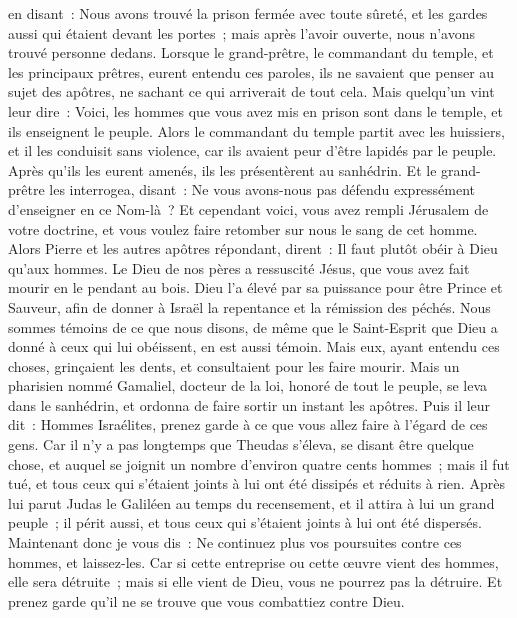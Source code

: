 \begin{multicols}{2}
en disant~: Nous avons trouvé la prison fermée avec toute sûreté, et les gardes aussi qui étaient devant les portes~; mais après l'avoir ouverte, nous n'avons trouvé personne dedans.
Lorsque le grand-prêtre, le commandant du temple, et les principaux prêtres, eurent entendu ces paroles, ils ne savaient que penser au sujet des apôtres, ne sachant ce qui arriverait de tout cela.
Mais quelqu'un vint leur dire~: Voici, les hommes que vous avez mis en prison sont dans le temple, et ils enseignent le peuple.
Alors le commandant du temple partit avec les huissiers, et il les conduisit sans violence, car ils avaient peur d'être lapidés par le peuple.
Après qu'ils les eurent amenés, ils les présentèrent au sanhédrin. Et le grand-prêtre les interrogea, disant~: 
Ne vous avons-nous pas défendu expressément d'enseigner en ce Nom-là~? Et cependant voici, vous avez rempli Jérusalem de votre doctrine, et vous voulez faire retomber sur nous le sang de cet homme.
Alors Pierre et les autres apôtres répondant, dirent~: Il faut plutôt obéir à Dieu qu'aux hommes.
Le Dieu de nos pères a ressuscité Jésus, que vous avez fait mourir en le pendant au bois.
Dieu l'a élevé par sa puissance pour être Prince et Sauveur, afin de donner à Israël la repentance et la rémission des péchés.
Nous sommes témoins de ce que nous disons, de même que le Saint-Esprit que Dieu a donné à ceux qui lui obéissent, en est aussi témoin.
Mais eux, ayant entendu ces choses, grinçaient les dents, et consultaient pour les faire mourir.
Mais un pharisien nommé Gamaliel, docteur de la loi, honoré de tout le peuple, se leva dans le sanhédrin, et ordonna de faire sortir un instant les apôtres.
Puis il leur dit~: Hommes Israélites, prenez garde à ce que vous allez faire à l'égard de ces gens.
Car il n'y a pas longtemps que Theudas s'éleva, se disant être quelque chose, et auquel se joignit un nombre d'environ quatre cents hommes~; mais il fut tué, et tous ceux qui s'étaient joints à lui ont été dissipés et réduits à rien.
Après lui parut Judas le Galiléen au temps du recensement, et il attira à lui un grand peuple~; il périt aussi, et tous ceux qui s'étaient joints à lui ont été dispersés.
Maintenant donc je vous dis~: Ne continuez plus vos poursuites contre ces hommes, et laissez-les. Car si cette entreprise ou cette œuvre vient des hommes, elle sera détruite~;
mais si elle vient de Dieu, vous ne pourrez pas la détruire. Et prenez garde qu'il ne se trouve que vous combattiez contre Dieu.

\end{multicols}
